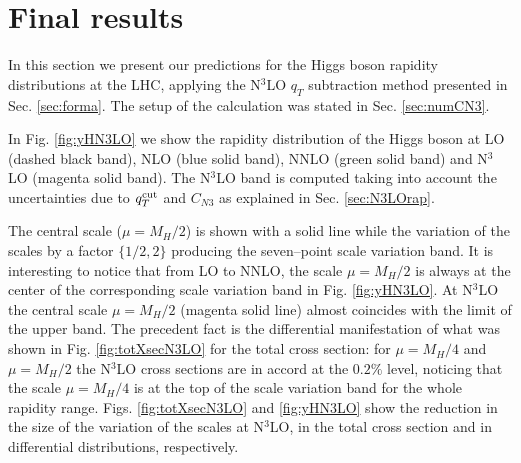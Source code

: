 \documentclass[12pt]{article}
\def\qt{q_T}
\begin{document}
\section{Final results}
\label{sec:results}

In this section we present our predictions for the Higgs boson rapidity distributions at the LHC, applying the N$^{3}$LO $\qt$ subtraction method presented in Sec.  \ref{sec:forma}. The setup of the calculation was stated in Sec. \ref{sec:numCN3}.

In Fig. \ref{fig:yHN3LO} we show the rapidity distribution of the Higgs boson at LO (dashed black band), NLO (blue solid band), NNLO (green solid band) and N$^{3}$LO (magenta solid band). The N$^{3}$LO band is computed taking into account the uncertainties due to $q_{T}^{\rm cut}$ and $C_{N3}$  as explained in Sec. \ref{sec:N3LOrap}.

The central scale ($\mu=M_{H}/2$) is shown with a solid line while the variation of the scales by a factor $\{1/2,2\}$ producing the seven--point scale variation band. It is interesting to notice that from LO to NNLO, the scale $\mu=M_{H}/2$ is always at the center of the corresponding scale variation band in Fig. \ref{fig:yHN3LO}.  At N$^{3}$LO the central scale $\mu=M_{H}/2$ (magenta solid line) almost coincides with the limit of the upper band. The precedent fact is the differential manifestation of what was shown in Fig. \ref{fig:totXsecN3LO} for the total cross section:  for $\mu=M_{H}/4$ and $\mu=M_{H}/2$ the N$^{3}$LO cross sections are in accord at the $0.2\%$ level, noticing that the scale $\mu=M_{H}/4$ is at the top of the scale variation band for the whole rapidity range. Figs. \ref{fig:totXsecN3LO} and \ref{fig:yHN3LO} show the reduction in the size of the variation of the scales at N$^{3}$LO, in the total cross section and in differential distributions, respectively.  
\end{document}
